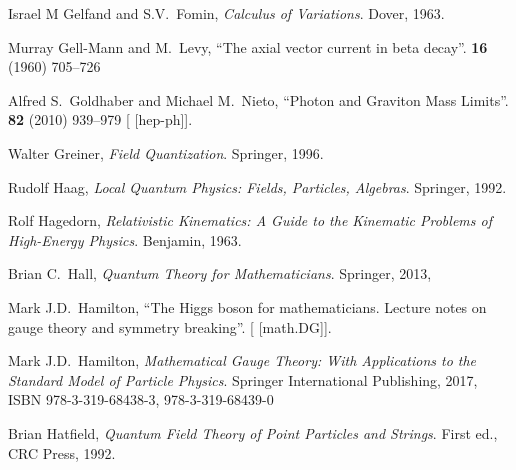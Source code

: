 \begin{thebibliography}{99}
Israel M Gelfand and S.V.~Fomin,
\textit{Calculus of Variations}.
Dover, 1963.

Murray Gell-Mann and M.~Levy,
``The axial vector current in beta decay''.
 \textbf{16} (1960) 705--726
{\tt{}}

Alfred S.~Goldhaber and Michael M.~Nieto,
``Photon and Graviton Mass Limits''.
 \textbf{82} (2010) 939--979
{\tt{}}
[ [hep-ph]].
\usesOurConventions

Walter Greiner,
\textit{Field Quantization}.
Springer, 1996.


Rudolf Haag,
\textit{Local Quantum Physics: Fields, Particles, Algebras}.
Springer, 1992.

Rolf Hagedorn,
\textit{Relativistic Kinematics: A Guide to the Kinematic Problems of High-Energy Physics}.
Benjamin, 1963.

Brian C.~Hall,
\textit{Quantum Theory for Mathematicians}.
Springer, 2013,
{\tt{}}

Mark J.D.\ Hamilton,
``The Higgs boson for mathematicians. Lecture notes on gauge theory and symmetry breaking''.
[ [math.DG]].

Mark J.D.\ Hamilton,
\textit{Mathematical Gauge Theory: With Applications to the Standard Model of Particle Physics}.
Springer International Publishing, 2017,
ISBN 978-3-319-68438-3, 978-3-319-68439-0
{\tt{}}

Brian Hatfield,
\textit{Quantum Field Theory of Point Particles and Strings}.
First ed., CRC Press, 1992.


\end{thebibliography}
